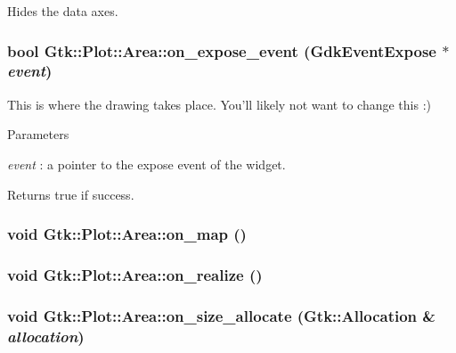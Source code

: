 Hides the data axes. \hypertarget{classGtk_1_1Plot_1_1Area_a5595741f965885c6c621ac2129d9ae34}{
\subsubsection[{on\_\-expose\_\-event}]{\setlength{\rightskip}{0pt plus 5cm}bool Gtk::Plot::Area::on\_\-expose\_\-event (GdkEventExpose $\ast$ {\em event})}}
\label{classGtk_1_1Plot_1_1Area_a5595741f965885c6c621ac2129d9ae34}
This is where the drawing takes place. You'll likely not want to change this :) 
\begin{DoxyParams}{Parameters}
\item[{\em event}]: a pointer to the expose event of the widget. \end{DoxyParams}
\begin{DoxyReturn}{Returns}
{\ttfamily true} if success. 
\end{DoxyReturn}
\hypertarget{classGtk_1_1Plot_1_1Area_aac03d26cdb161ccc33f34ef3dbcf428a}{
\subsubsection[{on\_\-map}]{\setlength{\rightskip}{0pt plus 5cm}void Gtk::Plot::Area::on\_\-map ()}}
\label{classGtk_1_1Plot_1_1Area_aac03d26cdb161ccc33f34ef3dbcf428a}
\hypertarget{classGtk_1_1Plot_1_1Area_acbcedd50e5503b656e14307c01569500}{
\subsubsection[{on\_\-realize}]{\setlength{\rightskip}{0pt plus 5cm}void Gtk::Plot::Area::on\_\-realize ()}}
\label{classGtk_1_1Plot_1_1Area_acbcedd50e5503b656e14307c01569500}
\hypertarget{classGtk_1_1Plot_1_1Area_a29ff37fa1a94277109a514bcbf90ac16}{
\subsubsection[{on\_\-size\_\-allocate}]{\setlength{\rightskip}{0pt plus 5cm}void Gtk::Plot::Area::on\_\-size\_\-allocate (Gtk::Allocation \& {\em allocation})}}
